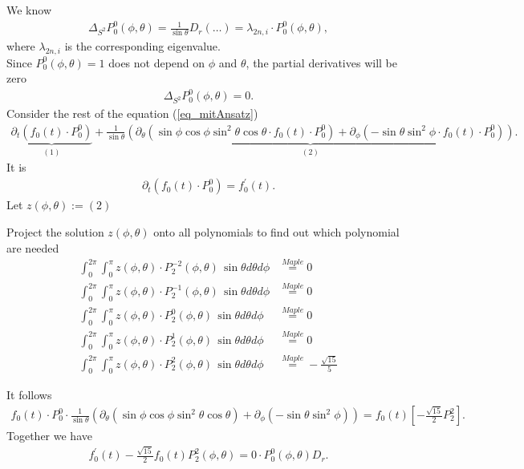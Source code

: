 \begin{frame}
	\scriptsize
	We know
	\begin{align*}
		\Delta_{S^2} P_0^0(\phi, \theta) = \frac{1}{\sin \theta} D_r (\ldots) = \lambda_{2n,i} \cdot P^{0}_0(\phi, \theta),
	\end{align*}
	where $\lambda_{2n,i}$ is the corresponding eigenvalue.\\
	Since $P_0^0(\phi, \theta) = 1$ does not depend on $\phi$ and $\theta$, the partial derivatives will be zero
	\begin{align}
		\Delta_{S^2} P_0^0(\phi, \theta) = 0.
	\end{align}
	Consider the rest of the equation (\ref{eq_mitAnsatz})
	\begin{align*}
		\underbrace{\partial_{t}(f_0(t) \cdot P_0^0)}_{(1)}+ \underbrace{\frac{1}{\sin\theta}\left( \partial_\theta(\sin \phi \cos \phi \sin ^2 \theta \cos \theta \cdot f_0(t) \cdot P_0^0)+ \partial_\phi(- \sin \theta \sin ^2 \phi \cdot f_0(t) \cdot P_0^0)\right)}_{(2)}.
	\end{align*}
	It is
	\begin{align*}
		\partial_t\left(f_0(t) \cdot P^0_0\right)=f_0^{\prime}(t).
	\end{align*}
	Let $z(\phi, \theta) := (2)$
\end{frame}

\begin{frame}
	\scriptsize
	Project the solution $z(\phi, \theta)$ onto all polynomials to find out which polynomial are needed
	\begin{align*}
		\int_{0}^{2\pi} \int_{0}^{\pi} z(\phi, \theta) \cdot P^{-2}_2(\phi, \theta) \, \sin \theta d\theta d\phi &\overset{Maple}{=} 0 \\
		\int_{0}^{2\pi} \int_{0}^{\pi} z(\phi, \theta) \cdot P^{-1}_2(\phi, \theta) \, \sin \theta d\theta d\phi &\overset{Maple}{=} 0 \\
		\int_{0}^{2\pi} \int_{0}^{\pi} z(\phi, \theta) \cdot P^{0}_2(\phi, \theta) \, \sin \theta d\theta d\phi &\overset{Maple}{=} 0 \\
		\int_{0}^{2\pi} \int_{0}^{\pi} z(\phi, \theta) \cdot P^{1}_2(\phi, \theta) \, \sin \theta d\theta d\phi &\overset{Maple}{=} 0 \\
		\int_{0}^{2\pi} \int_{0}^{\pi} z(\phi, \theta) \cdot P^{2}_2(\phi, \theta) \, \sin \theta d\theta d\phi &\overset{Maple}{=} -\frac{\sqrt{15}}{5}
	\end{align*}
\end{frame}

\begin{frame}
	\scriptsize
	It follows
	\begin{align}
		f_0(t) \cdot P^0_0 \cdot \frac{1}{\sin \theta}\left(\partial_\theta\left(\sin \phi \cos \phi \sin ^2 \theta \cos \theta\right)+\partial_\phi \left(-\sin \theta \sin ^2 \phi\right)\right) = f_0(t) \left[ -\frac{\sqrt{15}}{2} P^2_2 \right]. \label{teil1}
	\end{align}
	Together we have
	\begin{align*}
		f_0^{\prime}(t)-\frac{\sqrt{15}}{2} f_0(t) P_2^2(\phi,\theta) = 0\cdot  P^0_0(\phi, \theta)  D_r.
	\end{align*}
\end{frame}

